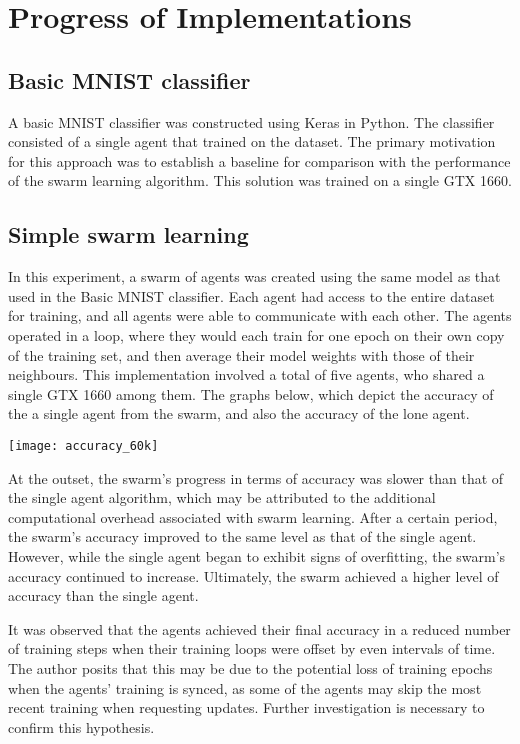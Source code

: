 \chapter{Progress of Implementations}

\section{Basic MNIST classifier}
A basic MNIST classifier was constructed using Keras in Python. The classifier consisted of a single agent that trained on the dataset. The primary motivation for this approach was to establish a baseline for comparison with the performance of the swarm learning algorithm. This solution was trained on a single GTX 1660.

\section{Simple swarm learning}
In this experiment, a swarm of agents was created using the same model as that used in the Basic MNIST classifier. Each agent had access to the entire dataset for training, and all agents were able to communicate with each other. The agents operated in a loop, where they would each train for one epoch on their own copy of the training set, and then average their model weights with those of their neighbours. This implementation involved a total of five agents, who shared a single GTX 1660 among them. The graphs below, which depict the accuracy of the a single agent from the swarm, and also the accuracy of the lone agent.

\texttt{[image: accuracy\_60k]}

At the outset, the swarm's progress in terms of accuracy was slower than that of the single agent algorithm, which may be attributed to the additional computational overhead associated with swarm learning. After a certain period, the swarm's accuracy improved to the same level as that of the single agent. However, while the single agent began to exhibit signs of overfitting, the swarm's accuracy continued to increase. Ultimately, the swarm achieved a higher level of accuracy than the single agent.

It was observed that the agents achieved their final accuracy in a reduced number of training steps when their training loops were offset by even intervals of time. The author posits that this may be due to the potential loss of training epochs when the agents' training is synced, as some of the agents may skip the most recent training when requesting updates. Further investigation is necessary to confirm this hypothesis.

